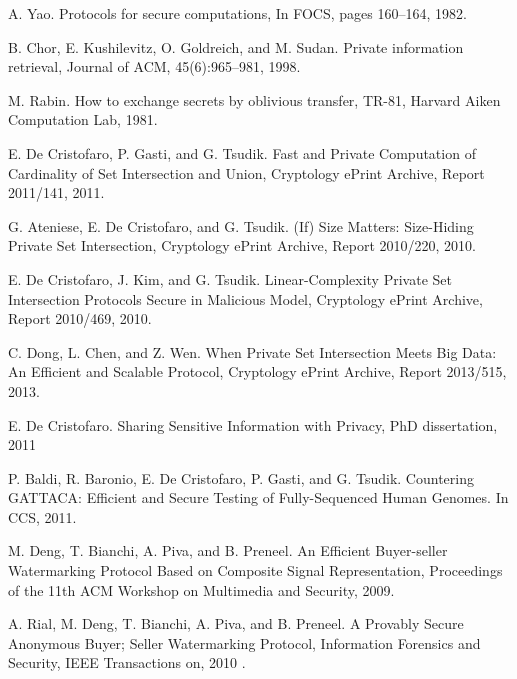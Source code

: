 \documentclass[dvips,12pt]{article}
\begin{document}
\begin{thebibliography}{99}

	A. Yao.
	Protocols for secure computations,	
	In FOCS, pages 160–164, 1982.
%

	B. Chor, E. Kushilevitz, O. Goldreich, and M. Sudan.
	Private information retrieval,
	Journal of ACM, 45(6):965–981, 
	1998.

	M. Rabin.
	How to exchange secrets by oblivious transfer,
	TR-81, Harvard Aiken Computation Lab, 
	1981.

	E. De Cristofaro, P. Gasti, and G. Tsudik.
	Fast and Private Computation of Cardinality of Set Intersection and Union, 
    Cryptology ePrint Archive, Report 2011/141,
    2011.
    
	G. Ateniese, E. De Cristofaro, and G. Tsudik.
    (If) Size Matters: Size-Hiding Private Set Intersection,
    Cryptology ePrint Archive, Report 2010/220,
	2010.

	E. De Cristofaro, J. Kim, and G. Tsudik.	
	Linear-Complexity Private Set Intersection Protocols Secure in Malicious Model,
	Cryptology ePrint Archive, Report 2010/469,
	2010.

	C. Dong, L. Chen, and Z. Wen.
	When Private Set Intersection Meets Big Data: An Efficient and Scalable Protocol,
	Cryptology ePrint Archive, Report 2013/515,
	2013.

	E. De Cristofaro.
	Sharing Sensitive Information with Privacy,
	PhD dissertation,
	2011

	P. Baldi, R. Baronio, E. De Cristofaro, P. Gasti, and G. Tsudik. 
	Countering GATTACA: Efficient and Secure Testing of Fully-Sequenced Human Genomes.
	In CCS, 
	2011.
	
	M. Deng, T. Bianchi, A. Piva, and B. Preneel.
	An Efficient Buyer-seller Watermarking Protocol Based on Composite Signal Representation,
	Proceedings of the 11th ACM Workshop on Multimedia and Security,
	2009.
	
	A. Rial, M. Deng, T. Bianchi, A. Piva, and B. Preneel.
	A Provably Secure Anonymous Buyer; Seller Watermarking Protocol,
	Information Forensics and Security, IEEE Transactions on,
	2010	.	


\end{thebibliography}
\end{document}
